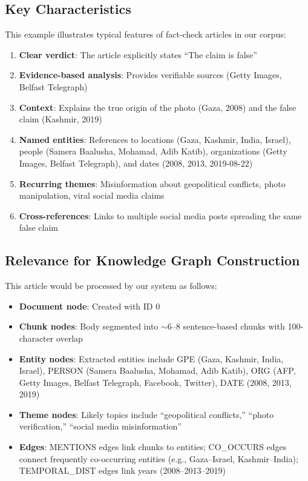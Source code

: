 \documentclass[10pt]{article}
\begin{document}
\subsection{Key Characteristics}

This example illustrates typical features of fact-check articles in our corpus:

\begin{enumerate}[itemsep=3pt]
    \item \textbf{Clear verdict}: The article explicitly states ``The claim is false''
    \item \textbf{Evidence-based analysis}: Provides verifiable sources (Getty Images, Belfast Telegraph)
    \item \textbf{Context}: Explains the true origin of the photo (Gaza, 2008) and the false claim (Kashmir, 2019)
    \item \textbf{Named entities}: References to locations (Gaza, Kashmir, India, Israel), people (Samera Baalusha, Mohamad, Adib Katib), organizations (Getty Images, Belfast Telegraph), and dates (2008, 2013, 2019-08-22)
    \item \textbf{Recurring themes}: Misinformation about geopolitical conflicts, photo manipulation, viral social media claims
    \item \textbf{Cross-references}: Links to multiple social media posts spreading the same false claim
\end{enumerate}

\subsection{Relevance for Knowledge Graph Construction}

This article would be processed by our system as follows:

\begin{itemize}[itemsep=3pt]
    \item \textbf{Document node}: Created with ID 0
    \item \textbf{Chunk nodes}: Body segmented into $\sim$6--8 sentence-based chunks with 100-character overlap
    \item \textbf{Entity nodes}: Extracted entities include GPE (Gaza, Kashmir, India, Israel), PERSON (Samera Baalusha, Mohamad, Adib Katib), ORG (AFP, Getty Images, Belfast Telegraph, Facebook, Twitter), DATE (2008, 2013, 2019)
    \item \textbf{Theme nodes}: Likely topics include ``geopolitical conflicts,'' ``photo verification,'' ``social media misinformation''
    \item \textbf{Edges}: MENTIONS edges link chunks to entities; CO\_OCCURS edges connect frequently co-occurring entities (e.g., Gaza--Israel, Kashmir--India); TEMPORAL\_DIST edges link years (2008--2013--2019)
\end{itemize}
\end{document}
